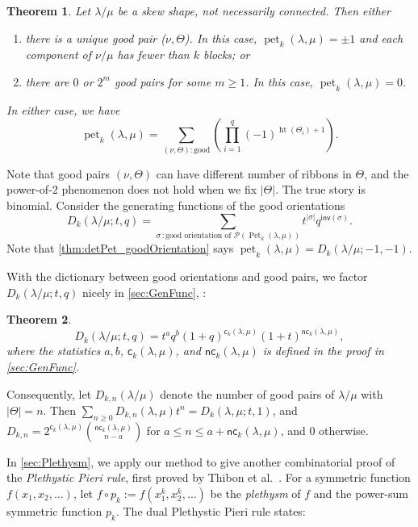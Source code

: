 \documentclass[pdflatex,sn-mathphys-num]{sn-jnl}%
\theoremstyle{thmstyleone}%
\newtheorem{theorem}{Theorem}[section]
\theoremstyle{thmstyletwo}%
\theoremstyle{thmstylethree}%
\numberwithin{equation}{section}
\DeclareMathOperator{\pet}{pet}
\DeclareMathOperator{\Pet}{Pet}
\DeclareMathOperator{\htt}{ht}
\begin{document}
\begin{theorem}
\label{thm:refinedJJL}
		Let $\lambda/\mu$ be a skew shape, not necessarily connected. Then either
\begin{enumerate}
\item there is a unique good pair ($\nu,\Theta$). In this case, $\pet_k(\lambda,\mu)=\pm 1$ and each component of $\nu/\mu$ has fewer than $k$ blocks; or
\item there are $0$ or $2^m$ good pairs for some $m\geq 1$. In this case, $\pet_k(\lambda,\mu)=0$.
\end{enumerate}
In either case, we have
		\[\pet_k(\lambda,\mu) = \sum_{(\nu,\Theta):\text{good}} \left(\prod_{i=1}^{q} (-1)^{\htt(\Theta_i)+1}\right).\]
\end{theorem}

\medskip
Note that good pairs $(\nu,\Theta)$ can have different number of ribbons in $\Theta$, and the power-of-2 phenomenon does not hold when we fix $|\Theta|$. The true story is binomial. Consider the generating functions of the good orientations \[D_k(\lambda/\mu; t,q)=\sum_{\sigma\,: \text{good orientation of }\mathcal{P}(\Pet_k(\lambda,\mu))} t^{|\sigma|} q^{\mathsf{inv}(\sigma)}.\] Note that \cref{thm:detPet_goodOrientation} says $\pet_k(\lambda,\mu)=D_k(\lambda/\mu; -1,-1)$. 

With the dictionary between good orientations and good pairs, we factor $D_k(\lambda/\mu; t,q)$ nicely in \cref{sec:GenFunc}, :
\begin{theorem}\label{thm:binomial}
        \[
            D_k(\lambda/\mu; t,q) = t^aq^b (1+q)^{\mathsf{c}_k(\lambda, \mu)} (1+t)^{\mathsf{nc}_k(\lambda, \mu)},
            \]
        where the statistics $a,b$, $\mathsf{c}_k(\lambda, \mu)$, and $\mathsf{nc}_k(\lambda, \mu)$ is defined in the proof in \cref{sec:GenFunc}.
\end{theorem}
Consequently, let $D_{k,n}(\lambda/\mu)$ denote the number of good pairs of $\lambda/\mu$ with $|\Theta|=n$. Then $\sum_{n\geq 0} D_{k,n}(\lambda,\mu)t^n = D_k(\lambda,\mu; t,1)$, and $D_{k,n}=2^{\mathsf{c}_k(\lambda, \mu)}\binom{\mathsf{nc}_k(\lambda, \mu)}{n-a}$ for $a\leq n\leq a+\mathsf{nc}_k(\lambda, \mu)$, and $0$ otherwise. 
\medskip

In \cref{sec:Plethysm}, we apply our method to give another combinatorial proof of the \emph{Plethystic Pieri rule}, first proved by Thibon et al.~\cite{Desarmenien1994}. For a symmetric function $f(x_1, x_2, \dots)$, let $f \circ p_k := f(x_1^k, x_2^k, \dots)$ be the \emph{plethysm} of $f$ and the power-sum symmetric function $p_k$. The dual Plethystic Pieri rule states:
\end{document}
